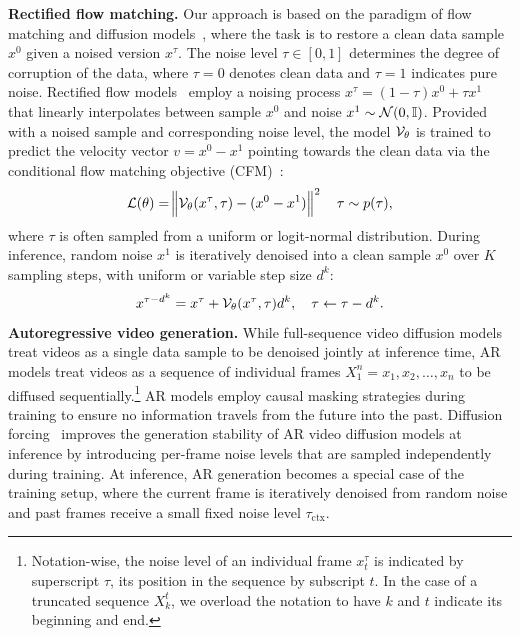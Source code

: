 \documentclass{article}
\theoremstyle{plain}
\theoremstyle{definition}
\theoremstyle{remark}
\begin{document}
\textbf{Rectified flow matching.} Our approach is based on the paradigm of flow matching and diffusion models~\citep{lipman2022flow}, where the task is to restore a clean data sample $x^0$ given a noised version $x^\tau$.
The noise level $\tau \in [0, 1]$ determines the degree of corruption of the data, where $\tau=0$ denotes clean data and $\tau=1$ indicates pure noise.
Rectified flow models~\citep{lipman2022flow,albergo2023building} employ a noising process $x^\tau = (1-\tau)x^0 + \tau x^1$ that linearly interpolates between sample $x^0$ and noise $x^1 \sim \mathcal{N}(0,{\mathbb{I}})$. 
Provided with a noised sample and corresponding noise level, the model ${\mathcal{V}}_\theta$ is trained to predict the velocity vector $v = x^0 - x^1$ pointing towards the clean data via the conditional flow matching objective (CFM)~\citep{lipman2022flow}: 
\begin{equation}
    \mathcal{L}(\theta) = \norm{{\mathcal{V}}_\theta (x^\tau, \tau) - (x^0 - x^1)}^2 \quad \tau \sim p(\tau),
\end{equation}
where $\tau$ is often sampled from a uniform or logit-normal distribution.
During inference, random noise $x^1$ is iteratively denoised into a clean sample $x^0$ over $K$ sampling steps, with uniform or variable step size $d^k$:
\begin{equation}
    x^{\tau - d^k} = x^\tau + {\mathcal{V}}_\theta (x^\tau, \tau) d^k, \quad \tau \leftarrow \tau - d^k.
\end{equation}
\textbf{Autoregressive video generation.} While full-sequence video diffusion models treat videos as a single data sample to be denoised jointly at inference time, AR models treat videos as a sequence of individual frames $X^{n}_1 = x_1,x_2,\dots,x_n$ to be diffused sequentially.\footnote{Notation-wise, the noise level of an individual frame $x^\tau_t$ is indicated by superscript $\tau$, its position in the sequence by subscript $t$.
In the case of a truncated sequence $X_k^{t}$, we overload the notation to have $k$ and $t$ indicate its beginning and end.} AR models employ causal masking strategies during training to ensure no information travels from the future into the past. Diffusion forcing~\citep{chen2024diffusion}
improves the generation stability of AR video diffusion models at inference by introducing per-frame noise levels that are sampled independently during training.
At inference, AR generation becomes a special case of the training setup, where the current frame is iteratively denoised from random noise and past frames receive a small fixed noise level $\tau_\text{ctx}$.
\end{document}
